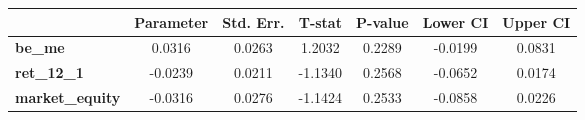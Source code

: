 \begin{tabular}{lcccccc}
\toprule
                        & \textbf{Parameter} & \textbf{Std. Err.} & \textbf{T-stat} & \textbf{P-value} & \textbf{Lower CI} & \textbf{Upper CI}  \\
\midrule
\textbf{be\_me}         &       0.0316       &       0.0263       &      1.2032     &      0.2289      &      -0.0199      &       0.0831       \\
\textbf{ret\_12\_1}     &      -0.0239       &       0.0211       &     -1.1340     &      0.2568      &      -0.0652      &       0.0174       \\
\textbf{market\_equity} &      -0.0316       &       0.0276       &     -1.1424     &      0.2533      &      -0.0858      &       0.0226       \\
\bottomrule
\end{tabular}
